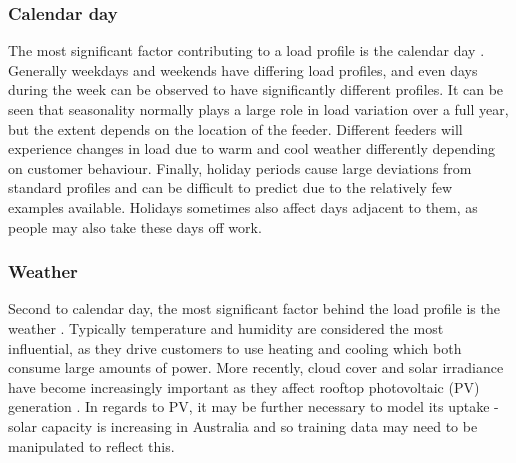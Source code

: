 \subsubsection{Calendar day}
The most significant factor contributing to a load profile is the calendar day \citep{Weron2006}.
Generally weekdays and weekends have differing load profiles, and even days during the week can be observed to have significantly different profiles.
It can be seen that seasonality normally plays a large role in load variation over a full year, but the extent depends on the location of the feeder.
Different feeders will experience changes in load due to warm and cool weather differently depending on customer behaviour.
Finally, holiday periods cause large deviations from standard profiles and can be difficult to predict due to the relatively few examples available.
Holidays sometimes also affect days adjacent to them, as people may also take these days off work.

\subsubsection{Weather}
Second to calendar day, the most significant factor behind the load profile is the weather \citep{Hippert2001}.
Typically temperature and humidity are considered the most influential, as they drive customers to use heating and cooling which both consume large amounts of power.
More recently, cloud cover and solar irradiance have become increasingly important as they affect rooftop photovoltaic (PV) generation \citet{AEMO2017}.
In regards to PV, it may be further necessary to model its uptake - solar capacity is increasing in Australia \citep{Jacobs2017} and so training data may need to be manipulated to reflect this.

